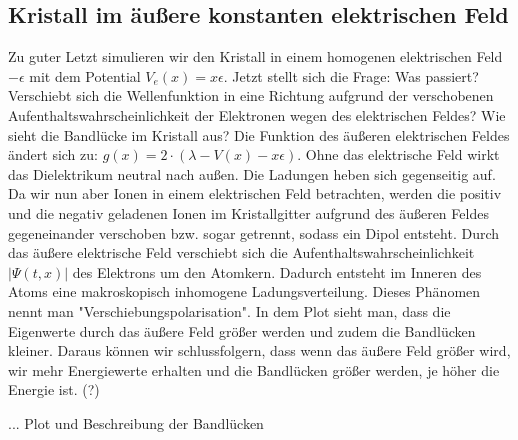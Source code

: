 \documentclass[ngerman]{scrartcl}
\begin{document}
\subsection{Kristall im äußere konstanten elektrischen Feld}
Zu guter Letzt simulieren wir den Kristall in einem homogenen elektrischen Feld $- \epsilon$ mit dem Potential $V_e(x) = x \epsilon$. Jetzt stellt sich die Frage: Was passiert? Verschiebt sich die Wellenfunktion in eine Richtung aufgrund der verschobenen Aufenthaltswahrscheinlichkeit der Elektronen wegen des elektrischen Feldes? Wie sieht die Bandlücke im Kristall aus? \newline
Die Funktion des äußeren elektrischen Feldes ändert sich zu: $g(x) = 2 \cdot (\lambda - V(x) - x\epsilon)$. Ohne das elektrische Feld wirkt das Dielektrikum neutral nach außen. Die Ladungen heben sich gegenseitig auf. Da wir nun aber Ionen in einem elektrischen Feld betrachten, werden die positiv und die negativ geladenen Ionen im Kristallgitter aufgrund des äußeren Feldes gegeneinander verschoben bzw. sogar getrennt, sodass ein Dipol entsteht. Durch das äußere elektrische Feld verschiebt sich die Aufenthaltswahrscheinlichkeit ${|\Psi(t,x)|}$ des Elektrons um den Atomkern. Dadurch entsteht im Inneren des Atoms eine makroskopisch inhomogene Ladungsverteilung. Dieses Phänomen nennt man "Verschiebungspolarisation". In dem Plot sieht man, dass die Eigenwerte durch das äußere Feld größer werden und zudem die Bandlücken kleiner. Daraus können wir schlussfolgern, dass wenn das äußere Feld größer wird, wir mehr Energiewerte erhalten und die Bandlücken größer werden, je höher die Energie ist. (?)

... Plot und Beschreibung der Bandlücken
\end{document}
